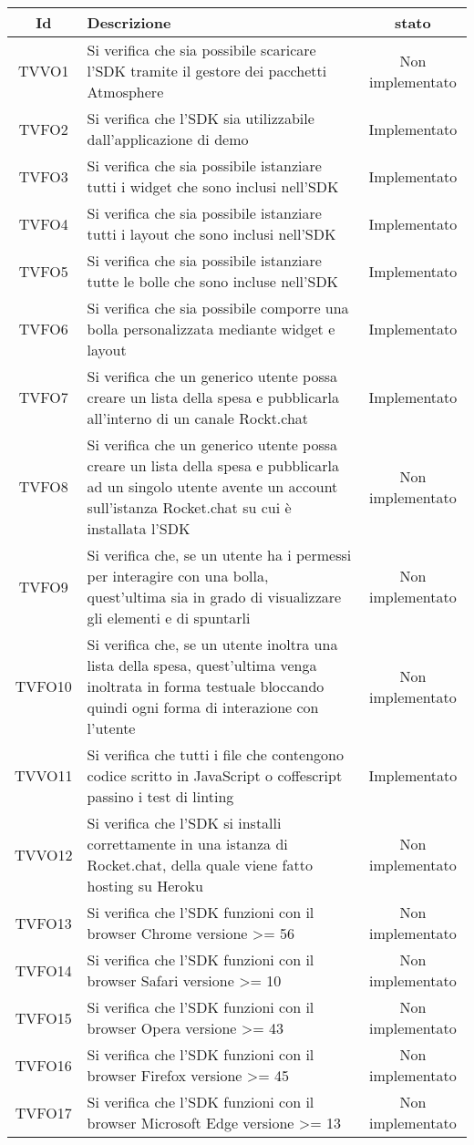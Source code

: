 \begin{center}
	\begin{longtable}{|c|>{\centering}m{10cm}|c|}\hline
		Id & Descrizione & stato \\ \hline
		TVVO1 & Si verifica che sia possibile scaricare l'SDK tramite il gestore dei pacchetti Atmosphere & Non implementato \\ \hline
		TVFO2 & Si verifica che l'SDK sia utilizzabile dall'applicazione di demo & Implementato \\ \hline
		TVFO3 & Si verifica che sia possibile istanziare tutti i widget che sono inclusi nell'SDK & Implementato \\ \hline
		TVFO4 & Si verifica che sia possibile istanziare tutti i layout che sono inclusi nell'SDK & Implementato \\ \hline
		TVFO5 & Si verifica che sia possibile istanziare tutte le bolle che sono incluse nell'SDK & Implementato \\ \hline
		TVFO6 & Si verifica che sia possibile comporre una bolla personalizzata mediante widget e layout & Implementato \\ \hline
		TVFO7 & Si verifica che un generico utente possa creare un lista della spesa e pubblicarla all'interno di un canale Rockt.chat & Implementato \\ \hline
		TVFO8 & Si verifica che un generico utente possa creare un lista della spesa e pubblicarla ad un singolo utente avente un account sull'istanza Rocket.chat su cui è installata l'SDK & Non implementato \\ \hline
		TVFO9 & Si verifica che, se un utente ha i permessi per interagire con una bolla, quest'ultima sia in grado di visualizzare gli elementi e di spuntarli & Non implementato \\ \hline
		TVFO10 & Si verifica che, se un utente inoltra una lista della spesa, quest'ultima venga inoltrata in forma testuale bloccando quindi ogni forma di interazione con l'utente & Non implementato \\ \hline
		TVVO11 & Si verifica che tutti i file che contengono codice scritto in JavaScript o coffescript passino i test di linting & Implementato \\ \hline
		TVVO12 & Si verifica che l'SDK si installi correttamente in una istanza di Rocket.chat, della quale viene fatto hosting su Heroku & Non implementato \\ \hline
		TVFO13 & Si verifica che l'SDK funzioni con il browser Chrome versione >= 56 & Non implementato \\ \hline
		TVFO14 & Si verifica che l'SDK funzioni con il browser Safari versione >= 10 & Non implementato \\ \hline
		TVFO15 & Si verifica che l'SDK funzioni con il browser Opera versione >= 43 & Non implementato \\ \hline
		TVFO16 & Si verifica che l'SDK funzioni con il browser Firefox versione >= 45 & Non implementato \\ \hline
		TVFO17 & Si verifica che l'SDK funzioni con il browser Microsoft Edge versione >= 13 & Non implementato \\ \hline
	\end{longtable}
\end{center}
